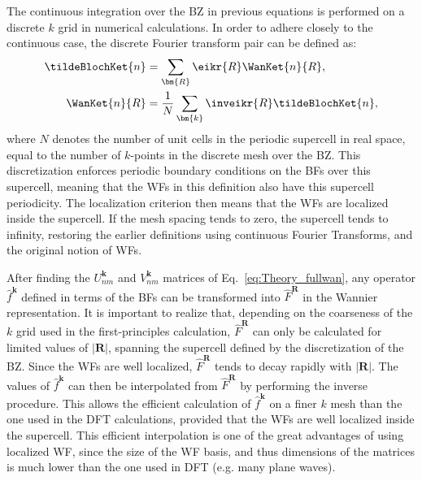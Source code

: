 The continuous integration over the \gls{BZ} in previous equations is performed on a discrete $k$ grid in numerical calculations.
In order to adhere closely to the continuous case, the discrete Fourier transform pair can be defined as:
\begin{align}
	\tildeBlochKet{n} &= \sum_{\bm{R}} \eikr{R} \WanKet{n}{R},\label{eq:Theory_wantok}\\
	\WanKet{n}{R} &= \frac{1}{N}\sum_{\bm{k}} \inveikr{R} \tildeBlochKet{n},
\end{align}
where $N$ denotes the number of unit cells in the periodic supercell in real space, equal to the number of $k$-points in the discrete mesh over the \gls{BZ}.
This discretization enforces periodic boundary conditions on the \glspl{BF} over this supercell, meaning that the \glspl{WF} in this definition also have this supercell periodicity.
The localization criterion then means that the \glspl{WF} are localized inside the supercell.
If the mesh spacing tends to zero, the supercell tends to infinity, restoring the earlier definitions using continuous Fourier Transforms, and the original notion of \glspl{WF}.

After finding the $U^{\bm{k}}_{nm}$ and $V^{\bm{k}}_{nm}$ matrices of Eq.~\eqref{eq:Theory_fullwan}, any operator $\hat{f}^{\bm{k}}$ defined in terms of the \glspl{BF} can be transformed into $\hat{F}^{\bm{R}}$ in the Wannier representation.
It is important to realize that, depending on the coarseness of the $k$ grid used in the first-principles calculation, $\hat{F}^{\bm{R}}$ can only be calculated for limited values of $|\bm{R}|$, spanning the supercell defined by the discretization of the \gls{BZ}.
Since the \glspl{WF} are well localized, $\hat{F}^{\bm{R}}$ tends to decay rapidly with $|\bm{R}|$.
The values of $\hat{f}^{\bm{k}}$ can then be interpolated from $\hat{F}^{\bm{R}}$ by performing the inverse procedure.
This allows the efficient calculation of $\hat{f}^{\bm{k}}$ on a finer $k$ mesh than the one used in the \gls{DFT} calculations, provided that the \glspl{WF} are well localized inside the supercell.
This efficient interpolation is one of the great advantages of using localized \gls{WF}, since the size of the \gls{WF} basis, and thus dimensions of the matrices is much lower than the one used in \gls{DFT} (e.g. many plane waves).

